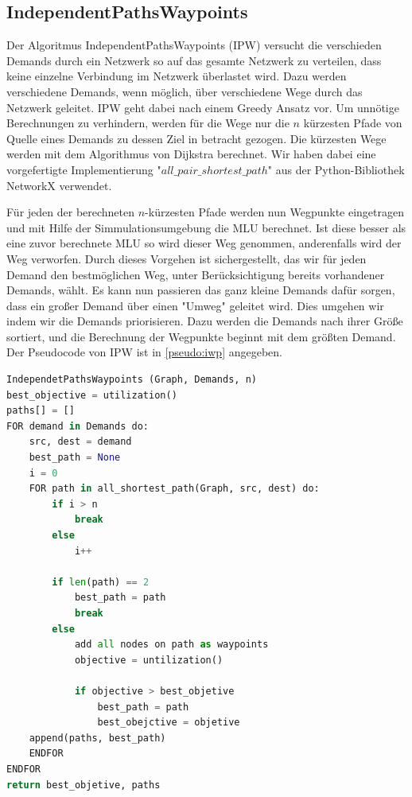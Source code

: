 \documentclass[sigconf,noacm,review]{acmart}
\begin{document}
\subsection{IndependentPathsWaypoints}
Der Algoritmus IndependentPathsWaypoints (IPW) versucht die verschieden Demands durch ein Netzwerk so auf das gesamte Netzwerk zu verteilen, dass keine einzelne Verbindung im Netzwerk überlastet wird. 
Dazu werden verschiedene Demands, wenn möglich, über verschiedene Wege durch das Netzwerk geleitet. 
IPW geht dabei nach einem Greedy Ansatz vor. 
Um unnötige Berechnungen zu verhindern, werden für die Wege nur die $n$ kürzesten Pfade von Quelle eines Demands zu dessen Ziel in betracht gezogen.
Die kürzesten Wege werden mit dem Algorithmus von Dijkstra \cite{10.1007/BF01386390} berechnet.
Wir haben dabei eine vorgefertigte Implementierung "$all\_pair\_shortest\_path$" aus der Python-Bibliothek NetworkX \cite{networkx} verwendet. 

Für jeden der berechneten $n$-kürzesten Pfade werden nun Wegpunkte eingetragen und mit Hilfe der Simmulationsumgebung \cite{python-simmulation} die MLU berechnet.
Ist diese besser als eine zuvor berechnete MLU so wird dieser Weg genommen, anderenfalls wird der Weg verworfen.
Durch dieses Vorgehen ist sichergestellt, das wir für jeden Demand den bestmöglichen Weg, unter Berücksichtigung bereits vorhandener Demands, wählt.
Es kann nun passieren das ganz kleine Demands dafür sorgen, dass ein großer Demand über einen "Umweg" geleitet wird.
Dies umgehen wir indem wir die Demands priorisieren. 
Dazu werden die Demands nach ihrer Größe sortiert, und die Berechnung der Wegpunkte beginnt mit dem größten Demand.
Der Pseudocode von IPW ist  in \ref{pseudo:iwp} angegeben.

\lstset{
  numbers=left,
  stepnumber=1,    
  firstnumber=1,
  numberfirstline=false
}
\begin{lstlisting}[language=Python, caption={Independet Paths Waypoints}, label=pseudo:iwp]
IndependetPathsWaypoints (Graph, Demands, n)
best_objective = utilization()
paths[] = []
FOR demand in Demands do:
    src, dest = demand
    best_path = None
    i = 0
    FOR path in all_shortest_path(Graph, src, dest) do:
        if i > n
            break
        else
            i++
        
        if len(path) == 2
            best_path = path
            break
        else
            add all nodes on path as waypoints
            objective = untilization()
            
            if objective > best_objetive
                best_path = path
                best_obejctive = objetive
    append(paths, best_path)
    ENDFOR
ENDFOR
return best_objetive, paths
    

\end{lstlisting}
\end{document}
